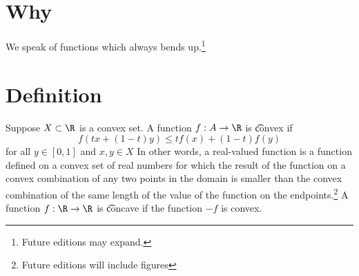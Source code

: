 

\section*{Why}

We speak of functions which always bends up.\footnote{Future editions may expand.}

\section*{Definition}

Suppose $X \subset \R $ is a convex set. A function $f: A \to \R $ is \t{convex} if
    \[
f(tx + (1-t)y) \leq tf(x) + (1-t)f(y)
    \]
for all $y \in [0,1]$ and $x, y \in X$
In other words, a real-valued function is a function defined on a convex set of real numbers for which the result of the function on a convex combination of any two points in the domain is smaller than the convex combination of the same length of the value of the function on the endpoints.\footnote{Future editions will include figures}
A function $f: \R  \to \R $ is \t{concave} if the function $-f$ is convex.

\blankpage